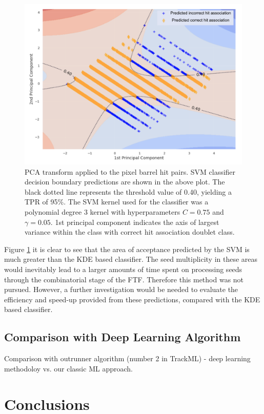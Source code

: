 \begin{figure}[!htbp]
\centering
\includegraphics[width=0.85\linewidth]{images/4-ml-based-predictor/barrel-svm-pca.png}
\caption{PCA transform applied to the pixel barrel hit pairs. SVM classifier decision boundary predictions are shown in the above plot. The black dotted line represents the threshold value of 0.40, yielding a TPR of 95\%. The SVM kernel used for the classifier was a polynomial degree 3 kernel with hyperparameters $C=0.75$ and $\gamma=0.05$. 1st principal component indicates the axis of largest variance within the class with correct hit association doublet class.}
\label{fig:barrel-svm-pca}
\end{figure}

Figure \ref{fig:barrel-svm-pca} it is clear to see that the area of acceptance predicted by the SVM is much greater than the KDE based classifier. The seed multiplicity in these areas would inevitably lead to a larger amounts of time spent on processing seeds through the combinatorial stage of the FTF. Therefore this method was not pursued. However, a further investigation would be needed to evaluate the efficiency and speed-up provided from these predictions, compared with the KDE based classifier.


\subsection{Comparison with Deep Learning Algorithm}

Comparison with outrunner algorithm (number 2 in TrackML) - deep learning methodoloy vs. our classic ML approach.


\section{Conclusions}

